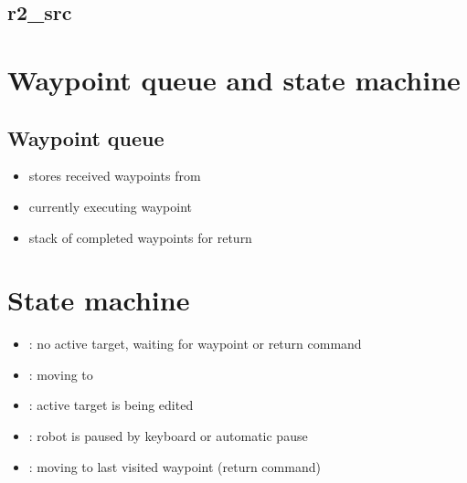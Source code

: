 \documentclass[letterpaper,10pt,english]{sphinxmanual}
\begin{document}
\subsection{r2\_src}
\label{\detokenize{technical_reference:r2-src}}
\noindent{}


\section{Waypoint queue and state machine}
\label{\detokenize{technical_reference:waypoint-queue-and-state-machine}}

\subsection{Waypoint queue}
\label{\detokenize{technical_reference:waypoint-queue}}\begin{itemize}
\item {} 
\sphinxAtStartPar
{} stores received waypoints from 

\item {} 
\sphinxAtStartPar
{} currently executing waypoint

\item {} 
\sphinxAtStartPar
{} stack of completed waypoints for return

\end{itemize}


\section{State machine}
\label{\detokenize{technical_reference:state-machine}}\begin{itemize}
\item {} 
\sphinxAtStartPar
{}: no active target, waiting for waypoint or return command

\item {} 
\sphinxAtStartPar
{}: moving to 

\item {} 
\sphinxAtStartPar
{}: active target is being edited

\item {} 
\sphinxAtStartPar
{}: robot is paused by keyboard or automatic pause

\item {} 
\sphinxAtStartPar
{}: moving to last visited waypoint (return command)

\end{itemize}
\end{document}
